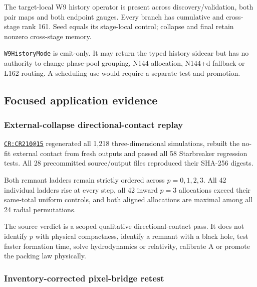 The target-local W9 history operator is present across
discovery/validation, both pair maps and both endpoint gauges. Every
branch has cumulative and cross-stage rank 161. Seed equals its
stage-local control; collapse and final retain nonzero cross-stage
memory.

\texttt{W9HistoryMode} is emit-only. It may return the typed history
sidecar but has no authority to change phase-pool grouping, N144
allocation, N144+d fallback or L162 routing. A scheduling use would
require a separate test and promotion.

\subsection{Focused application
evidence}\label{viii-ch08-focused-application-evidence}

\subsubsection{External-collapse directional-contact
replay}\label{viii-ch08-external-collapse-directional-contact-replay}

\href{https://github.com/iwtbotiwtwot/SAMA/blob/4c2b5dc1649da5900c90b90d0ce56c223dbb7717/tests/courtroom/15-scale-bridge-simulator-cr210-starbreaker-3d-external-collapse-contact/README.md}{\texttt{CR:CR210@15}}
regenerated all 1,218 three-dimensional simulations, rebuilt the no-fit
external contact from fresh outputs and passed all 58 Starbreaker
regression tests. All 28 precommitted source/output files reproduced
their SHA-256 digests.

Both remnant ladders remain strictly ordered across \(p=0,1,2,3\). All
42 individual ladders rise at every step, all 42 inward \(p=3\)
allocations exceed their same-total uniform controls, and both aligned
allocations are maximal among all 24 radial permutations.

The source verdict is a scoped qualitative directional-contact pass. It
does not identify \(p\) with physical compactness, identify a remnant
with a black hole, test faster formation time, solve hydrodynamics or
relativity, calibrate A or promote the packing law physically.

\subsubsection{Inventory-corrected pixel-bridge
retest}\label{viii-ch08-inventory-corrected-pixel-bridge-retest}

